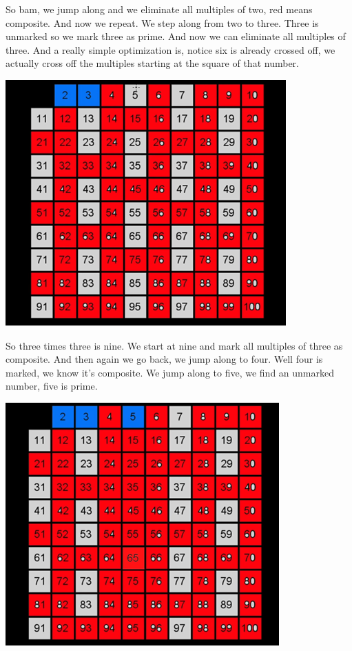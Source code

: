 \documentclass{report}
\begin{document}
 So bam, we jump along and we eliminate all multiples of two, red means composite. And now we repeat. We step along from two to three. Three is unmarked so we mark three as prime. And now we can eliminate all multiples of three. And a really simple optimization is, notice six is already crossed off, we actually cross off the multiples starting at the square of that number.
\begin{center}
	\includegraphics[scale=1]{50.png}
\end{center}
 So three times three is nine. We start at nine and mark all multiples of three as composite. And then again we go back, we jump along to four. Well four is marked, we know it's composite. We jump along to five, we find an unmarked number, five is prime.
\begin{center}
	\includegraphics[scale=1]{51.png}
\end{center}
\end{document}
